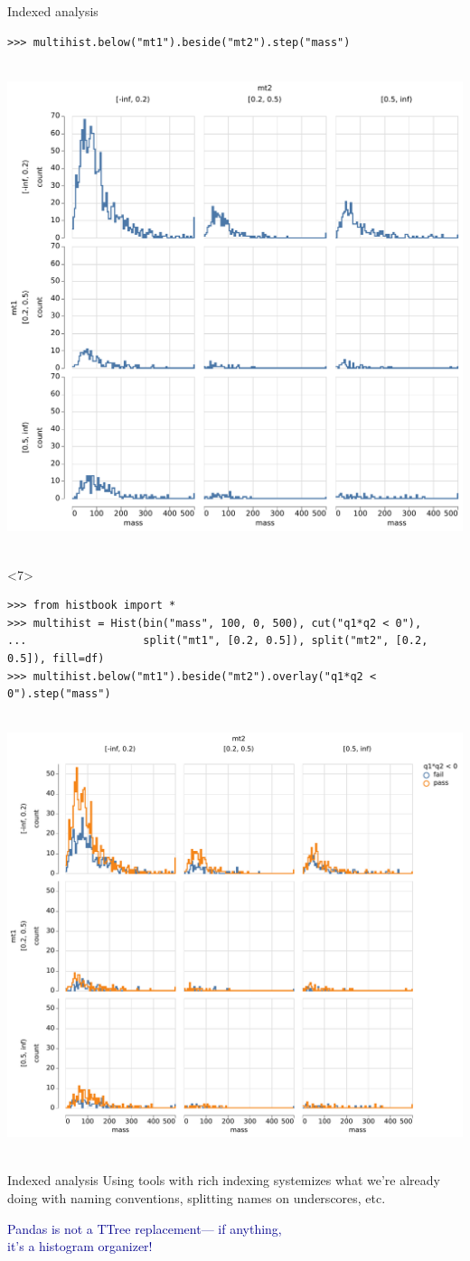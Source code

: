 \documentclass[aspectratio=169]{beamer}
\begin{document}
\begin{frame}[fragile]{Indexed analysis}
\begin{onlyenv}
\begin{verbatim}
>>> multihist.below("mt1").beside("mt2").step("mass")
\end{verbatim}
\mbox{ } \hfill \includegraphics[height=7 cm]{pandhist_double_trellis.pdf} \hfill \mbox{ }
\end{onlyenv}
\begin{onlyenv}<7>
\scriptsize
\begin{verbatim}
>>> from histbook import *
>>> multihist = Hist(bin("mass", 100, 0, 500), cut("q1*q2 < 0"),
...                  split("mt1", [0.2, 0.5]), split("mt2", [0.2, 0.5]), fill=df)
>>> multihist.below("mt1").beside("mt2").overlay("q1*q2 < 0").step("mass")
\end{verbatim}
\mbox{ } \hfill \includegraphics[height=7 cm]{pandhist_double_trellis_overlay.pdf} \hfill \mbox{ }
\end{onlyenv}
\end{frame}

\begin{frame}{Indexed analysis}
\Large
\vspace{0.5 cm}
Using tools with rich indexing systemizes what we're already doing with naming conventions, splitting names on underscores, etc.

\vspace{1 cm}
\begin{center}
\textcolor{darkblue}{Pandas is not a TTree replacement--- if anything,\\it's a histogram organizer!}
\end{center}

\vspace{1 cm}
\end{frame}
\end{document}

